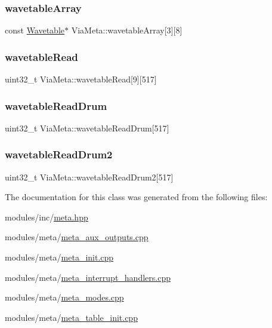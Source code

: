 \subsubsection{\texorpdfstring{wavetable\+Array}{wavetableArray}}
{\footnotesize\ttfamily const \mbox{\hyperlink{struct_wavetable}{Wavetable}}$\ast$ Via\+Meta\+::wavetable\+Array\mbox{[}3\mbox{]}\mbox{[}8\mbox{]}}

\mbox{\label{class_via_meta_aedee75e7f255d70c7292972d5e5eef65}} 
\subsubsection{\texorpdfstring{wavetable\+Read}{wavetableRead}}
{\footnotesize\ttfamily uint32\+\_\+t Via\+Meta\+::wavetable\+Read\mbox{[}9\mbox{]}\mbox{[}517\mbox{]}}

\mbox{\label{class_via_meta_a8b0b6f0072b72144fe3f894b6303a0d4}} 
\subsubsection{\texorpdfstring{wavetable\+Read\+Drum}{wavetableReadDrum}}
{\footnotesize\ttfamily uint32\+\_\+t Via\+Meta\+::wavetable\+Read\+Drum\mbox{[}517\mbox{]}}

\mbox{\label{class_via_meta_aceb676011c9259d33d690fe1101421a4}} 
\subsubsection{\texorpdfstring{wavetable\+Read\+Drum2}{wavetableReadDrum2}}
{\footnotesize\ttfamily uint32\+\_\+t Via\+Meta\+::wavetable\+Read\+Drum2\mbox{[}517\mbox{]}}



The documentation for this class was generated from the following files\+:\begin{DoxyCompactItemize}
\item 
modules/inc/\mbox{\hyperlink{meta_8hpp}{meta.\+hpp}}\item 
modules/meta/\mbox{\hyperlink{meta__aux__outputs_8cpp}{meta\+\_\+aux\+\_\+outputs.\+cpp}}\item 
modules/meta/\mbox{\hyperlink{meta__init_8cpp}{meta\+\_\+init.\+cpp}}\item 
modules/meta/\mbox{\hyperlink{meta__interrupt__handlers_8cpp}{meta\+\_\+interrupt\+\_\+handlers.\+cpp}}\item 
modules/meta/\mbox{\hyperlink{meta__modes_8cpp}{meta\+\_\+modes.\+cpp}}\item 
modules/meta/\mbox{\hyperlink{meta__table__init_8cpp}{meta\+\_\+table\+\_\+init.\+cpp}}\end{DoxyCompactItemize}
